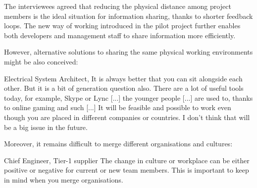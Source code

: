  The interviewees agreed that reducing the physical distance among project members is the ideal situation for information sharing, thanks to shorter feedback loops. The new way of working introduced in the pilot project further enables both developers and management staff to share information more efficiently.  %

However, alternative solutions to sharing the same physical working environments might be also conceived:

\begin{aquote}{Electrical System Architect, \company{}}
It is always better that you can sit alongside each other. But it is a bit of generation question also. There are a lot of useful tools today, for example, Skype or Lync [...] the younger people [...] %
are used to, thanks to online gaming and such [...] %
It will be feasible and possible to work even though you are placed in different companies or countries. I don't think that will be a big issue in the future.
\end{aquote}

Moreover, it %
remains difficult to merge different organisations and cultures:

\begin{aquote}{Chief Engineer, Tier-1 supplier}
The change in culture or workplace can be either positive or negative for current or new team members. This is important to keep in mind when you merge organisations.
\end{aquote}

%
%
%


